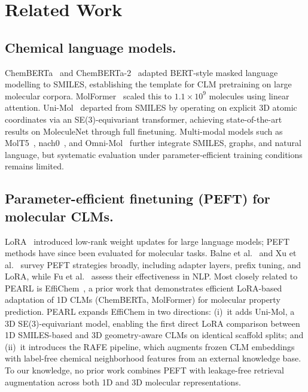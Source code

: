 \documentclass[pdflatex,sn-mathphys-num]{sn-jnl}%
\theoremstyle{thmstyleone}%
\theoremstyle{thmstyletwo}%
\theoremstyle{thmstylethree}%
\begin{document}
\section{Related Work}\label{related_work}

\subsection{Chemical language models.} \label{CLMs}
ChemBERTa~\cite{chithrananda2020chemberta} and ChemBERTa-2~\cite{ahmad2022chemberta2} adapted BERT-style masked language modelling to SMILES, establishing the template for CLM pretraining on large molecular corpora.
MolFormer~\cite{ross2022molformer} scaled this to $1.1\times10^9$ molecules using linear attention.
Uni-Mol~\cite{zhou2023unimol} departed from SMILES by operating on explicit 3D atomic coordinates via an SE(3)-equivariant transformer, achieving state-of-the-art results on MoleculeNet through full finetuning.
Multi-modal models such as MolT5~\cite{edwards2022molt5}, nach0~\cite{livne2024nach0}, and Omni-Mol~\cite{hu2025omnimol} further integrate SMILES, graphs, and natural language, but systematic evaluation under parameter-efficient training conditions remains limited.

\subsection{Parameter-efficient finetuning (PEFT) for molecular CLMs.} \label{PEFT}
LoRA~\cite{hu2021lora} introduced low-rank weight updates for large language models; PEFT methods have since been evaluated for molecular tasks.
Balne et al.~\cite{balne2024peft} and Xu et al.~\cite{xu2023peftreview} survey PEFT strategies broadly, including adapter layers, prefix tuning, and LoRA, while
Fu et al.~\cite{fu2023effectiveness} assess their effectiveness in NLP.
Most closely related to PEARL is EffiChem~\cite{harod2025effichem}, a prior work that demonstrates efficient LoRA-based adaptation of 1D CLMs (ChemBERTa, MolFormer) for molecular property prediction.
PEARL expands EffiChem in two directions: (i)~it adds Uni-Mol, a 3D SE(3)-equivariant model, enabling the first direct LoRA comparison between 1D SMILES-based and 3D geometry-aware CLMs on identical scaffold splits; and (ii)~it introduces the RAFE pipeline, which augments frozen CLM embeddings with label-free chemical neighborhood features from an external knowledge base.
To our knowledge, no prior work combines PEFT with leakage-free retrieval augmentation across both 1D and 3D molecular representations.
\end{document}
